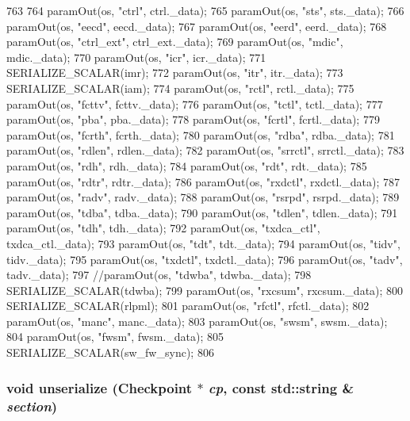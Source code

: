 \begin{DoxyCode}
763     {
764         paramOut(os, "ctrl", ctrl._data);
765         paramOut(os, "sts", sts._data);
766         paramOut(os, "eecd", eecd._data);
767         paramOut(os, "eerd", eerd._data);
768         paramOut(os, "ctrl_ext", ctrl_ext._data);
769         paramOut(os, "mdic", mdic._data);
770         paramOut(os, "icr", icr._data);
771         SERIALIZE_SCALAR(imr);
772         paramOut(os, "itr", itr._data);
773         SERIALIZE_SCALAR(iam);
774         paramOut(os, "rctl", rctl._data);
775         paramOut(os, "fcttv", fcttv._data);
776         paramOut(os, "tctl", tctl._data);
777         paramOut(os, "pba", pba._data);
778         paramOut(os, "fcrtl", fcrtl._data);
779         paramOut(os, "fcrth", fcrth._data);
780         paramOut(os, "rdba", rdba._data);
781         paramOut(os, "rdlen", rdlen._data);
782         paramOut(os, "srrctl", srrctl._data);
783         paramOut(os, "rdh", rdh._data);
784         paramOut(os, "rdt", rdt._data);
785         paramOut(os, "rdtr", rdtr._data);
786         paramOut(os, "rxdctl", rxdctl._data);
787         paramOut(os, "radv", radv._data);
788         paramOut(os, "rsrpd", rsrpd._data);
789         paramOut(os, "tdba", tdba._data);
790         paramOut(os, "tdlen", tdlen._data);
791         paramOut(os, "tdh", tdh._data);
792         paramOut(os, "txdca_ctl", txdca_ctl._data);
793         paramOut(os, "tdt", tdt._data);
794         paramOut(os, "tidv", tidv._data);
795         paramOut(os, "txdctl", txdctl._data);
796         paramOut(os, "tadv", tadv._data);
797         //paramOut(os, "tdwba", tdwba._data);
798         SERIALIZE_SCALAR(tdwba);
799         paramOut(os, "rxcsum", rxcsum._data);
800         SERIALIZE_SCALAR(rlpml);
801         paramOut(os, "rfctl", rfctl._data);
802         paramOut(os, "manc", manc._data);
803         paramOut(os, "swsm", swsm._data);
804         paramOut(os, "fwsm", fwsm._data);
805         SERIALIZE_SCALAR(sw_fw_sync);
806     }
\end{DoxyCode}
\hypertarget{structiGbReg_1_1Regs_af22e5d6d660b97db37003ac61ac4ee49}{
\subsubsection[{unserialize}]{\setlength{\rightskip}{0pt plus 5cm}void unserialize ({\bf Checkpoint} $\ast$ {\em cp}, \/  const std::string \& {\em section})}}
\label{structiGbReg_1_1Regs_af22e5d6d660b97db37003ac61ac4ee49}



